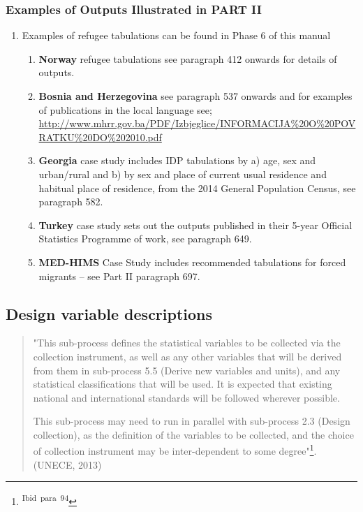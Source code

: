 \documentclass[
]{article}
\begin{document}
\hypertarget{examples-of-outputs-illustrated-in-part-ii}{%
\subsubsection{Examples of Outputs Illustrated in PART II}\label{examples-of-outputs-illustrated-in-part-ii}}

\begin{enumerate}
\def\labelenumi{\arabic{enumi}.}
\setcounter{enumi}{72}
\item
  Examples of refugee tabulations can be found in Phase 6 of this
  manual

  \begin{enumerate}
  \def\labelenumii{\arabic{enumii}.}
  \item
    \textbf{Norway} refugee tabulations see paragraph 412 onwards for
    details of outputs.
  \item
    \textbf{Bosnia and Herzegovina} see paragraph 537 onwards and for
    examples of publications in the local language see;
    \url{http://www.mhrr.gov.ba/PDF/Izbjeglice/INFORMACIJA\%20O\%20POVRATKU\%20DO\%202010.pdf}
  \item
    \textbf{Georgia} case study includes IDP tabulations by a) age, sex
    and urban/rural and b) by sex and place of current usual
    residence and habitual place of residence, from the 2014 General
    Population Census, see paragraph 582.
  \item
    \textbf{Turkey} case study sets out the outputs published in their
    5-year Official Statistics Programme of work, see paragraph 649.
  \item
    \textbf{MED-HIMS} Case Study includes recommended tabulations for
    forced migrants -- see Part II paragraph 697.
  \end{enumerate}
\end{enumerate}

\hypertarget{design-variable-descriptions}{%
\subsection{Design variable descriptions}\label{design-variable-descriptions}}

\begin{quote}
"This sub-process defines the statistical variables to be collected
via the collection instrument, as well as any other variables that
will be derived from them in sub-process 5.5 (Derive new variables and
units), and any statistical classifications that will be used. It is
expected that existing national and international standards will be
followed wherever possible.

This sub-process may need to run in parallel with sub-process 2.3
(Design collection), as the definition of the variables to be
collected, and the choice of collection instrument may be
inter-dependent to some degree"\footnote{\textsuperscript{Ibid~para~94}}. (UNECE, 2013)
\end{quote}
\end{document}
